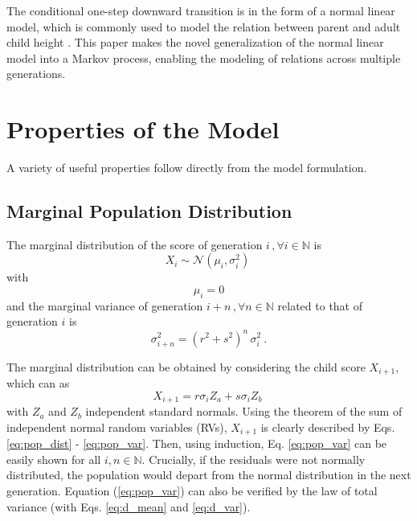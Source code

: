 \documentclass{svproc} %
\begin{document}
The conditional one-step downward transition is in the form of a normal linear model, which is commonly used to model the relation between parent and adult child height \cite{luo}. This paper makes the novel generalization of the normal linear model into a Markov process, enabling the modeling of relations across multiple generations. 


\section{Properties of the Model}

A variety of useful properties follow directly from the model formulation. 

\subsection{Marginal Population Distribution}
The marginal distribution of the score of generation $i \, , \forall i \in \mathbb{N}$ is
\begin{equation}
X_i \sim \mathcal{N}(\mu_i, \sigma_i^2) \ 
\label{eq:pop_dist}
\end{equation}
with
\begin{equation}
\mu_i = 0 
\label{eq:pop_mean}
\end{equation}
and the marginal variance of generation $i+n \, , \forall n \in \mathbb{N}$ related to that of generation $i$ is
\begin{equation}
\sigma_{i+n}^2 = (r^2+s^2)^n  \, \sigma_{i}^2 \ .
\label{eq:pop_var}
\end{equation}

The marginal distribution can be obtained by considering the child score $X_{i+1}$, which can as
\begin{equation}
X_{i+1} = r\sigma_iZ_a + s\sigma_iZ_b \ 
\label{eq:derive_pop_var}
\end{equation}
with $Z_a$ and $Z_b$ independent standard normals. Using the theorem of the sum of independent normal random variables (RVs),  $X_{i+1}$ is clearly described by Eqs. \ref{eq:pop_dist} - \ref{eq:pop_var}. Then, using induction, Eq. \ref{eq:pop_var} can be easily shown for all $i, n \in \mathbb{N}$. Crucially, if the residuals were not normally distributed, the population would depart from the normal distribution in the next generation. Equation (\ref{eq:pop_var}) can also be verified by the law of total variance (with Eqs. \ref{eq:d_mean} and \ref{eq:d_var}).
\end{document}
